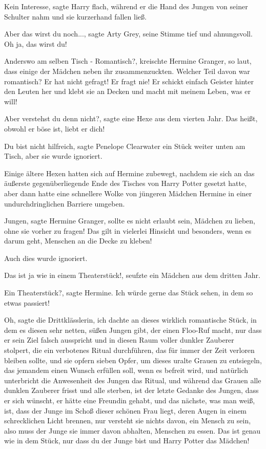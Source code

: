 \glqq Kein Interesse\grqq{}, sagte Harry flach, während er die Hand des Jungen
von seiner Schulter nahm und sie kurzerhand fallen ließ.

\glqq Aber das wirst du noch...\grqq{}, sagte Arty Grey, seine Stimme tief und
ahnungsvoll. \glqq Oh ja, das wirst du!\grqq{}

Anderswo am selben Tisch - \glqq Romantisch?\grqq{}, kreischte Hermine Granger,
so laut, dass einige der Mädchen neben ihr zusammenzuckten. \glqq Welcher Teil
davon war romantisch? Er hat nicht gefragt! Er fragt nie! Er schickt einfach
Geister hinter den Leuten her und klebt sie an Decken und macht mit meinem
Leben, was er will!\grqq{}

\glqq Aber verstehst du denn nicht?\grqq{}, sagte eine Hexe aus dem vierten
Jahr. \glqq Das heißt, obwohl er böse ist, liebt er dich!\grqq{}

\glqq Du bist nicht hilfreich\grqq{}, sagte Penelope Clearwater ein Stück weiter
unten am Tisch, aber sie wurde ignoriert.

Einige ältere Hexen hatten sich auf Hermine zubewegt, nachdem sie sich an das
äußerste gegenüberliegende Ende des Tisches von Harry Potter gesetzt hatte, aber
dann hatte eine schnellere Wolke von jüngeren Mädchen Hermine in einer
undurchdringlichen Barriere umgeben.

\glqq Jungen\grqq{}, sagte Hermine Granger, \glqq sollte es nicht erlaubt sein,
Mädchen zu lieben, ohne sie vorher zu fragen! Das gilt in vielerlei Hinsicht und
besonders, wenn es darum geht, Menschen an die Decke zu kleben!\grqq{}

Auch dies wurde ignoriert.

\glqq Das ist ja wie in einem Theaterstück!\grqq{}, seufzte ein Mädchen aus dem
dritten Jahr.

\glqq Ein Theaterstück?\grqq{}, sagte Hermine. \glqq Ich würde gerne das Stück
sehen, in dem so etwas passiert!\grqq{}

\glqq Oh\grqq{}, sagte die Drittklässlerin, \glqq ich dachte an dieses wirklich
romantische Stück, in dem es diesen sehr netten, süßen Jungen gibt, der einen
Floo-Ruf macht, nur dass er sein Ziel falsch ausspricht und in diesen Raum
voller dunkler Zauberer stolpert, die ein verbotenes Ritual durchführen, das für
immer der Zeit verloren bleiben sollte, und sie opfern sieben Opfer, um dieses
uralte Grauen zu entsiegeln, das jemandem einen Wunsch erfüllen soll, wenn es
befreit wird, und natürlich unterbricht die Anwesenheit des Jungen das Ritual,
und während das Grauen alle dunklen Zauberer frisst und alle sterben, ist der
letzte Gedanke des Jungen, dass er sich wünscht, er hätte eine Freundin gehabt,
und das nächste, was man weiß, ist, dass der Junge im Schoß dieser schönen Frau
liegt, deren Augen in einem schrecklichen Licht brennen, nur versteht sie nichts
davon, ein Mensch zu sein, also muss der Junge sie immer davon abhalten,
Menschen zu essen. Das ist genau wie in dem Stück, nur dass du der Junge bist
und Harry Potter das Mädchen!\grqq{}

